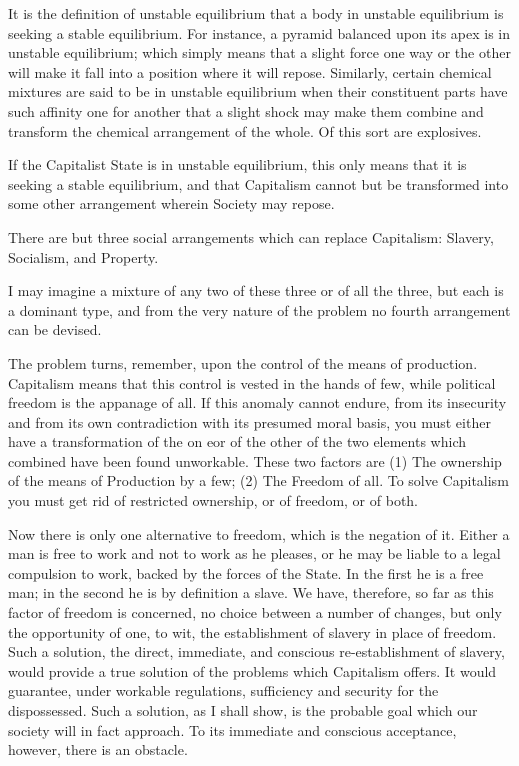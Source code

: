 \documentclass{book}
\begin{document}
It is the definition of unstable equilibrium that a body in unstable equilibrium is seeking a stable equilibrium. For instance, a pyramid balanced upon its apex is in unstable equilibrium; which simply means that a slight force one way or the other will make it fall into a position where it will repose. Similarly, certain chemical mixtures are said to be in unstable equilibrium when their constituent parts have such affinity one for another that a slight shock may make them combine and transform the chemical arrangement of the whole. Of this sort are explosives.

If the Capitalist State is in unstable equilibrium, this only means that it is seeking a stable equilibrium, and that Capitalism cannot but be transformed into some other arrangement wherein Society may repose.

There are but three social arrangements which can replace Capitalism: Slavery, Socialism, and Property.

I may imagine a mixture of any two of these three or of all the three, but each is a dominant type, and from the very nature of the problem no fourth arrangement can be devised.

The problem turns, remember, upon the control of the means of production. Capitalism means that this control is vested in the hands of few, while political freedom is the appanage of all. If this anomaly cannot endure, from its insecurity and from its own contradiction with its presumed moral basis, you must either have a transformation of the on eor of the other of the two elements which combined have been found unworkable. These two factors are (1) The ownership of the means of Production by a few; (2) The Freedom of all. To solve Capitalism you must get rid of restricted ownership, or of freedom, or of both.

Now there is only one alternative to freedom, which is the negation of it. Either a man is free to work and not to work as he pleases, or he may be liable to a legal compulsion to work, backed by the forces of the State. In the first he is a free man; in the second he is by definition a slave. We have, therefore, so far as this factor of freedom is concerned, no choice between a number of changes, but only the opportunity of one, to wit, the establishment of slavery in place of freedom. Such a solution, the direct, immediate, and conscious re-establishment of slavery, would provide a true solution of the problems which Capitalism offers. It would guarantee, under workable regulations, sufficiency and security for the dispossessed. Such a solution, as I shall show, is the probable goal which our society will in fact approach. To its immediate and conscious acceptance, however, there is an obstacle.
\end{document}

